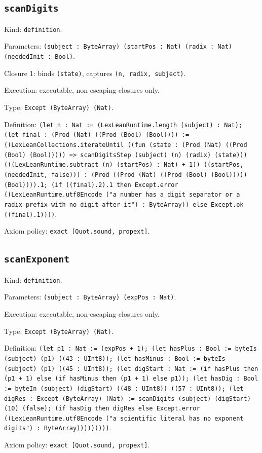 \documentclass[11pt]{article}
\begin{document}
\subsection*{\texttt{scanDigits}}
\noindent Kind: \texttt{definition}.\par
\noindent Parameters: \texttt{(subject : ByteArray) (startPos : Nat) (radix : Nat) (neededInit : Bool)}.\par
\noindent Closure 1: binds \texttt{(state)}, captures \texttt{(n, radix, subject)}.\par
\noindent Execution: executable, non-escaping closures only.\par
\noindent Type: \texttt{Except (ByteArray) (Nat)}.\par
\noindent Definition: \texttt{(let n : Nat := (LexLeanRuntime.length (subject) : Nat); (let final : (Prod (Nat) ((Prod (Bool) (Bool)))) := ((LexLeanCollections.iterateUntil ((fun (state : (Prod (Nat) ((Prod (Bool) (Bool))))) => scanDigitsStep (subject) (n) (radix) (state))) (((LexLeanRuntime.subtract (n) (startPos) : Nat) + 1)) ((startPos, (neededInit, false))) : (Prod ((Prod (Nat) ((Prod (Bool) (Bool))))) (Bool)))).1; (if ((final).2).1 then Except.error ((LexLeanRuntime.utf8Encode ("a number has a digit separator or a radix prefix with no digit after it") : ByteArray)) else Except.ok ((final).1))))}.\par
\noindent Axiom policy: \texttt{exact [Quot.sound, propext]}.\par
\subsection*{\texttt{scanExponent}}
\noindent Kind: \texttt{definition}.\par
\noindent Parameters: \texttt{(subject : ByteArray) (expPos : Nat)}.\par
\noindent Execution: executable, non-escaping closures only.\par
\noindent Type: \texttt{Except (ByteArray) (Nat)}.\par
\noindent Definition: \texttt{(let p1 : Nat := (expPos + 1); (let hasPlus : Bool := byteIs (subject) (p1) ((43 : UInt8)); (let hasMinus : Bool := byteIs (subject) (p1) ((45 : UInt8)); (let digStart : Nat := (if hasPlus then (p1 + 1) else (if hasMinus then (p1 + 1) else p1)); (let hasDig : Bool := byteIn (subject) (digStart) ((48 : UInt8)) ((57 : UInt8)); (let digRes : Except (ByteArray) (Nat) := scanDigits (subject) (digStart) (10) (false); (if hasDig then digRes else Except.error ((LexLeanRuntime.utf8Encode ("a scientific literal has no exponent digits") : ByteArray)))))))))}.\par
\noindent Axiom policy: \texttt{exact [Quot.sound, propext]}.\par
\end{document}
